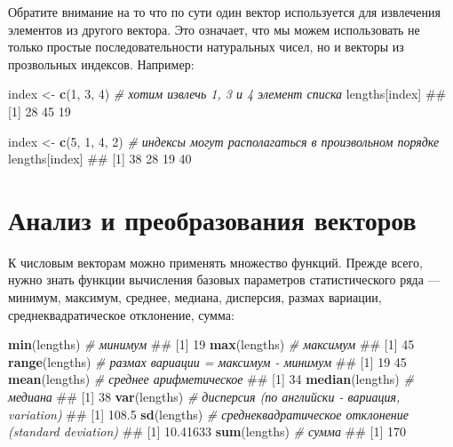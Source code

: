\documentclass[]{book}
\newenvironment{Shaded}{\begin{snugshade}}{\end{snugshade}}
\newcommand{\KeywordTok}[1]{\textcolor[rgb]{0.13,0.29,0.53}{\textbf{#1}}}
\newcommand{\DecValTok}[1]{\textcolor[rgb]{0.00,0.00,0.81}{#1}}
\newcommand{\StringTok}[1]{\textcolor[rgb]{0.31,0.60,0.02}{#1}}
\newcommand{\CommentTok}[1]{\textcolor[rgb]{0.56,0.35,0.01}{\textit{#1}}}
\newcommand{\NormalTok}[1]{#1}
\begin{document}
Обратите внимание на то что по сути один вектор используется для
извлечения элементов из другого вектора. Это означает, что мы можем
использовать не только простые последовательности натуральных чисел, но
и векторы из прозвольных индексов. Например:

\begin{Shaded}
\begin{Highlighting}[]
\NormalTok{index <-}\StringTok{ }\KeywordTok{c}\NormalTok{(}\DecValTok{1}\NormalTok{, }\DecValTok{3}\NormalTok{, }\DecValTok{4}\NormalTok{) }\CommentTok{# хотим извлечь 1, 3 и 4 элемент списка}
\NormalTok{lengths[index]}
\NormalTok{## [1] 28 45 19}

\NormalTok{index <-}\StringTok{ }\KeywordTok{c}\NormalTok{(}\DecValTok{5}\NormalTok{, }\DecValTok{1}\NormalTok{, }\DecValTok{4}\NormalTok{, }\DecValTok{2}\NormalTok{) }\CommentTok{# индексы могут располагаться в произвольном порядке}
\NormalTok{lengths[index]}
\NormalTok{## [1] 38 28 19 40}
\end{Highlighting}
\end{Shaded}

\section{Анализ и преобразования векторов}\label{vector_transform}

К числовым векторам можно применять множество функций. Прежде всего,
нужно знать функции вычисления базовых параметров статистического ряда
--- минимум, максимум, среднее, медиана, дисперсия, размах вариации,
среднеквадратическое отклонение, сумма:

\begin{Shaded}
\begin{Highlighting}[]
\KeywordTok{min}\NormalTok{(lengths) }\CommentTok{# минимум}
\NormalTok{## [1] 19}
\KeywordTok{max}\NormalTok{(lengths) }\CommentTok{# максимум}
\NormalTok{## [1] 45}
\KeywordTok{range}\NormalTok{(lengths) }\CommentTok{# размах вариации = максимум - минимум}
\NormalTok{## [1] 19 45}
\KeywordTok{mean}\NormalTok{(lengths) }\CommentTok{# среднее арифметическое}
\NormalTok{## [1] 34}
\KeywordTok{median}\NormalTok{(lengths) }\CommentTok{# медиана}
\NormalTok{## [1] 38}
\KeywordTok{var}\NormalTok{(lengths) }\CommentTok{# дисперсия (по английски - вариация, variation)}
\NormalTok{## [1] 108.5}
\KeywordTok{sd}\NormalTok{(lengths) }\CommentTok{# среднеквадратическое отклонение (standard deviation)}
\NormalTok{## [1] 10.41633}
\KeywordTok{sum}\NormalTok{(lengths) }\CommentTok{# сумма}
\NormalTok{## [1] 170}
\end{Highlighting}
\end{Shaded}
\end{document}
